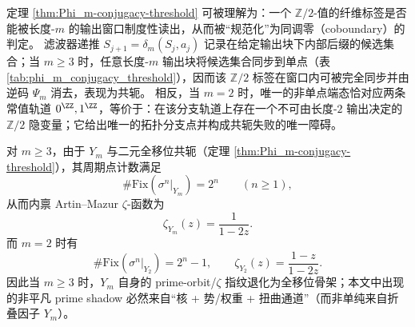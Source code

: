 \begin{remark}[可逆性阈值的同调解释：\(m=2\) 的唯一分支点对应不可消去的 \texorpdfstring{$\mathbb{Z}/2$}{Z/2} 隐变量]\label{rem:Phi_m-conjugacy-threshold-z2-homology}
定理 \ref{thm:Phi_m-conjugacy-threshold} 可被理解为：一个 \(\mathbb{Z}/2\)-值的纤维标签是否能被长度-\(m\) 的输出窗口制度性读出，从而被“规范化”为同调零（coboundary）的判定。
滤波器递推 \(S_{j+1}=\delta_m(S_j,a_j)\) 记录在给定输出块下内部后缀的候选集合；当 \(m\ge 3\) 时，任意长度-\(m\) 输出块将候选集合同步到单点（表 \ref{tab:phi_m_conjugacy_threshold}），因而该 \(\mathbb{Z}/2\) 标签在窗口内可被完全同步并由逆码 \(\Psi_m\) 消去，表现为共轭。
相反，当 \(m=2\) 时，唯一的非单点端态恰对应两条常值轨道 \(0^{\ZZ},1^{\ZZ}\)，等价于：在该分支轨道上存在一个不可由长度-\(2\) 输出决定的 \(\mathbb{Z}/2\) 隐变量；它给出唯一的拓扑分支点并构成共轭失败的唯一障碍。
\end{remark}

\begin{corollary}\label{cor:Phi_m-zeta-closed}
对 $m\ge 3$，由于 $Y_m$ 与二元全移位共轭（定理 \ref{thm:Phi_m-conjugacy-threshold}），其周期点计数满足
$$
\#\mathrm{Fix}(\sigma^n|_{Y_m})=2^n\qquad(n\ge 1),
$$
从而内禀 Artin--Mazur \(\zeta\)-函数为
$$
\zeta_{Y_m}(z)=\frac{1}{1-2z}.
$$
而 $m=2$ 时有
$$
\#\mathrm{Fix}(\sigma^n|_{Y_2})=2^n-1,\qquad
\zeta_{Y_2}(z)=\frac{1-z}{1-2z}.
$$
因此当 $m\ge 3$ 时，$Y_m$ 自身的 prime-orbit/\(\zeta\) 指纹退化为全移位骨架；本文中出现的非平凡 prime shadow 必然来自“核 + 势/权重 + 扭曲通道”（而非单纯来自折叠因子 $Y_m$）。
\end{corollary}
